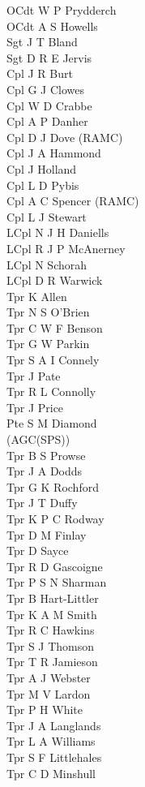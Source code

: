 \begin{multicols}{3}
  \small
  \noindent
  OCdt W P Prydderch \\
  OCdt A S Howells \\
  Sgt J T Bland \\
  Sgt D R E Jervis \\
  Cpl J R Burt \\
  Cpl G J Clowes \\
  Cpl W D Crabbe \\
  Cpl A P Danher \\
  Cpl D J Dove (RAMC) \\
  Cpl J A Hammond \\
  Cpl J Holland \\
  Cpl L D Pybis \\
  Cpl A C Spencer (RAMC) \\
  Cpl L J Stewart \\
  LCpl N J H Daniells \\
  LCpl R J P McAnerney \\
  LCpl N Schorah \\
  LCpl D R Warwick \\
  Tpr K Allen \\
  Tpr N S O'Brien \\
  Tpr C W F Benson \\
  Tpr G W Parkin \\
  Tpr S A I Connely \\
  Tpr J Pate \\
  Tpr R L Connolly \\
  Tpr J Price \\
  Pte S M Diamond \\ \indent (AGC(SPS)) \\
  Tpr B S Prowse \\
  Tpr J A Dodds \\
  Tpr G K Rochford \\
  Tpr J T Duffy \\
  Tpr K P C Rodway \\
  Tpr D M Finlay \\
  Tpr D Sayce \\
  Tpr R D Gascoigne \\
  Tpr P S N Sharman \\
  Tpr B Hart-Littler \\
  Tpr K A M Smith \\
  Tpr R C Hawkins \\
  Tpr S J Thomson \\
  Tpr T R Jamieson \\
  Tpr A J Webster \\
  Tpr M V Lardon \\
  Tpr P H White \\
  Tpr J A Langlands \\
  Tpr L A Williams \\
  Tpr S F Littlehales \\
  Tpr C D Minshull \\
\end{multicols}

